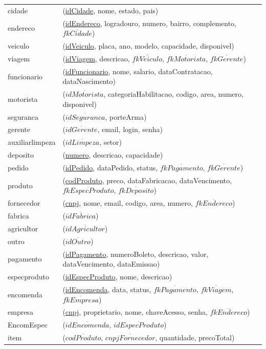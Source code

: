 \documentclass[12pt, onecolumn, titlepage]{article}
\begin{document}
\begin{table}[htb!]
\begin{center}
\begin{tabular}{p{2.5cm} p{10.5cm}}
cidade & (\underline{idCidade}, nome, estado, pais) \\
endereco & (\underline{idEndereco}, logradouro, numero, bairro, complemento, $\overline{fkCidade}$) \\
veiculo & (\underline{idVeiculo}, placa, ano, modelo, capacidade, disponivel) \\
viagem & (\underline{idViagem}, descricao, $\overline{fkVeiculo}$, $\overline{fkMotorista}$, $\overline{fkGerente}$) \\
funcionario & (\underline{idFuncionario}, nome, salario, dataContratacao, dataNascimento)\\
motorista & (\underline{$\overline{idMotorista}$}, categoriaHabilitacao, codigo, area, numero, disponivel)\\
seguranca & (\underline{$\overline{idSeguranca}$}, porteArma)\\
gerente & (\underline{$\overline{idGerente}$}, email, login, senha)\\
auxiliarlimpeza & (\underline{$\overline{idLimpeza}$}, setor)\\
deposito & (\underline{numero}, descricao, capacidade)\\
pedido & (\underline{idPedido}, dataPedido, status, $\overline{fkPagamento}$, $\overline{fkGerente}$)\\
produto & (\underline{codProduto}, preco, dataFabricacao, dataVencimento, $\overline{fkEspecProduto}$, $\overline{fkDeposito}$)\\
fornecedor & (\underline{cnpj}, nome, email, codigo, area, numero, $\overline{fkEndereco}$)\\
fabrica & (\underline{$\overline{idFabrica}$})\\
agricultor & (\underline{$\overline{idAgricultor}$})\\
outro & (\underline{$\overline{idOutro}$})\\
pagamento & (\underline{idPagamento}, numeroBoleto, descricao, valor, dataVencimento, dataEmissao)\\
especproduto & (\underline{idEspecProduto}, nome, descricao)\\
encomenda & (\underline{idEncomenda}, data, status, $\overline{fkPagamento}$, $\overline{fkViagem}$, $\overline{fkEmpresa}$)\\
empresa & (\underline{cnpj}, proprietario, nome, chaveAcesso, senha, $\overline{fkEndereco}$)\\
EncomEspec & (\underline{$\overline{idEncomenda}$}, \underline{$\overline{idEspecProduto}$})\\
item & (\underline{$\overline{codProduto}$}, \underline{$\overline{cnpjFornecedor}$}, quantidade, precoTotal)
\end{tabular}
\end{center}
\end{table}
\end{document}
